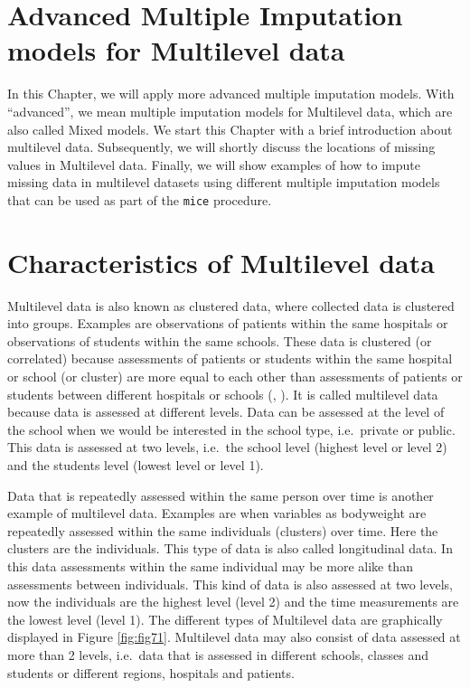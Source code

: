 \documentclass[
]{book}
\begin{document}
\hypertarget{advanced-multiple-imputation-models-for-multilevel-data}{%
\section{Advanced Multiple Imputation models for Multilevel data}\label{advanced-multiple-imputation-models-for-multilevel-data}}

In this Chapter, we will apply more advanced multiple imputation models. With ``advanced'', we mean multiple imputation models for Multilevel data, which are also called Mixed models. We start this Chapter with a brief introduction about multilevel data. Subsequently, we will shortly discuss the locations of missing values in Multilevel data. Finally, we will show examples of how to impute missing data in multilevel datasets using different multiple imputation models that can be used as part of the \texttt{mice} procedure.

\hypertarget{characteristics-of-multilevel-data}{%
\section{Characteristics of Multilevel data}\label{characteristics-of-multilevel-data}}

Multilevel data is also known as clustered data, where collected data is clustered into groups. Examples are observations of patients within the same hospitals or observations of students within the same schools. These data is clustered (or correlated) because assessments of patients or students within the same hospital or school (or cluster) are more equal to each other than assessments of patients or students between different hospitals or schools (\citet{twisk2006appliedmultilevelanalysis}, \citet{hox2018multilevelanalysis}). It is called multilevel data because data is assessed at different levels. Data can be assessed at the level of the school when we would be interested in the school type, i.e.~private or public. This data is assessed at two levels, i.e.~the school level (highest level or level 2) and the students level (lowest level or level 1).

Data that is repeatedly assessed within the same person over time is another example of multilevel data. Examples are when variables as bodyweight are repeatedly assessed within the same individuals (clusters) over time. Here the clusters are the individuals. This type of data is also called longitudinal data. In this data assessments within the same individual may be more alike than assessments between individuals. This kind of data is also assessed at two levels, now the individuals are the highest level (level 2) and the time measurements are the lowest level (level 1). The different types of Multilevel data are graphically displayed in Figure \ref{fig:fig71}. Multilevel data may also consist of data assessed at more than 2 levels, i.e.~data that is assessed in different schools, classes and students or different regions, hospitals and patients.
\end{document}
